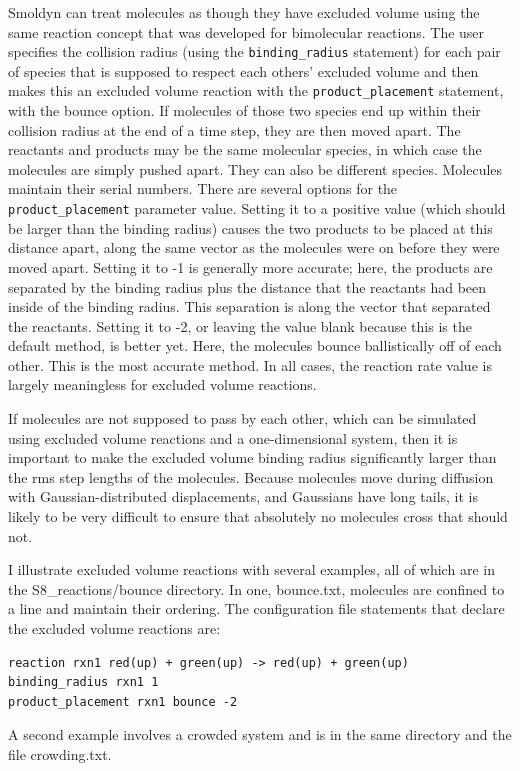 \documentclass {book}
\newcommand {\ttt} {\texttt}
\begin{document}
Smoldyn can treat molecules as though they have excluded volume using the same reaction concept that was developed for bimolecular reactions. The user specifies the collision radius (using the \ttt{binding\_radius} statement) for each pair of species that is supposed to respect each others' excluded volume and then makes this an excluded volume reaction with the \ttt{product\_placement} statement, with the bounce option. If molecules of those two species end up within their collision radius at the end of a time step, they are then moved apart. The reactants and products may be the same molecular species, in which case the molecules are simply pushed apart. They can also be different species. Molecules maintain their serial numbers. There are several options for the \ttt{product\_placement} parameter value. Setting it to a positive value (which should be larger than the binding radius) causes the two products to be placed at this distance apart, along the same vector as the molecules were on before they were moved apart. Setting it to -1 is generally more accurate; here, the products are separated by the binding radius plus the distance that the reactants had been inside of the binding radius. This separation is along the vector that separated the reactants. Setting it to -2, or leaving the value blank because this is the default method, is better yet. Here, the molecules bounce ballistically off of each other. This is the most accurate method. In all cases, the reaction rate value is largely meaningless for excluded volume reactions.

If molecules are not supposed to pass by each other, which can be simulated using excluded volume reactions and a one-dimensional system, then it is important to make the excluded volume binding radius significantly larger than the rms step lengths of the molecules. Because molecules move during diffusion with Gaussian-distributed displacements, and Gaussians have long tails, it is likely to be very difficult to ensure that absolutely no molecules cross that should not.

I illustrate excluded volume reactions with several examples, all of which are in the S8\_reactions/bounce directory. In one, bounce.txt, molecules are confined to a line and maintain their ordering. The configuration file statements that declare the excluded volume reactions are:
\begin{lstlisting}[style=SSAC]
reaction rxn1 red(up) + green(up) -> red(up) + green(up)
binding_radius rxn1 1
product_placement rxn1 bounce -2
\end{lstlisting}
A second example involves a crowded system and is in the same directory and the file crowding.txt.
\end{document}

